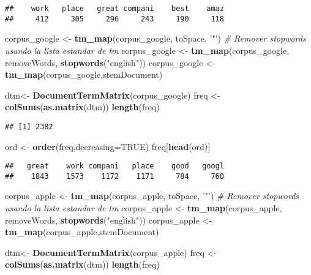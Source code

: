 \documentclass[]{article}
\newenvironment{Shaded}{\begin{snugshade}}{\end{snugshade}}
\newcommand{\KeywordTok}[1]{\textcolor[rgb]{0.13,0.29,0.53}{\textbf{#1}}}
\newcommand{\DataTypeTok}[1]{\textcolor[rgb]{0.13,0.29,0.53}{#1}}
\newcommand{\StringTok}[1]{\textcolor[rgb]{0.31,0.60,0.02}{#1}}
\newcommand{\CommentTok}[1]{\textcolor[rgb]{0.56,0.35,0.01}{\textit{#1}}}
\newcommand{\OtherTok}[1]{\textcolor[rgb]{0.56,0.35,0.01}{#1}}
\newcommand{\NormalTok}[1]{#1}
\begin{document}
\begin{verbatim}
##    work   place   great compani    best    amaz 
##     412     305     296     243     190     118
\end{verbatim}

\begin{Shaded}
\begin{Highlighting}[]
\NormalTok{corpus_google <-}\StringTok{ }\KeywordTok{tm_map}\NormalTok{(corpus_google, toSpace, }\StringTok{'"'}\NormalTok{)}
\CommentTok{# Remover stopwords usando la lista estandar de tm}
\NormalTok{corpus_google <-}\StringTok{ }\KeywordTok{tm_map}\NormalTok{(corpus_google, removeWords, }\KeywordTok{stopwords}\NormalTok{(}\StringTok{"english"}\NormalTok{))}
\NormalTok{corpus_google <-}\StringTok{ }\KeywordTok{tm_map}\NormalTok{(corpus_google,stemDocument)}

\NormalTok{dtm<-}\StringTok{ }\KeywordTok{DocumentTermMatrix}\NormalTok{(corpus_google)}
\NormalTok{freq <-}\StringTok{ }\KeywordTok{colSums}\NormalTok{(}\KeywordTok{as.matrix}\NormalTok{(dtm))}
\KeywordTok{length}\NormalTok{(freq)}
\end{Highlighting}
\end{Shaded}

\begin{verbatim}
## [1] 2382
\end{verbatim}

\begin{Shaded}
\begin{Highlighting}[]
\NormalTok{ord <-}\StringTok{ }\KeywordTok{order}\NormalTok{(freq,}\DataTypeTok{decreasing=}\OtherTok{TRUE}\NormalTok{)}
\NormalTok{freq[}\KeywordTok{head}\NormalTok{(ord)]}
\end{Highlighting}
\end{Shaded}

\begin{verbatim}
##   great    work compani   place    good   googl 
##    1843    1573    1172    1171     784     760
\end{verbatim}

\begin{Shaded}
\begin{Highlighting}[]
\NormalTok{corpus_apple <-}\StringTok{ }\KeywordTok{tm_map}\NormalTok{(corpus_apple, toSpace, }\StringTok{'"'}\NormalTok{)}
\CommentTok{# Remover stopwords usando la lista estandar de tm}
\NormalTok{corpus_apple <-}\StringTok{ }\KeywordTok{tm_map}\NormalTok{(corpus_apple, removeWords, }\KeywordTok{stopwords}\NormalTok{(}\StringTok{"english"}\NormalTok{))}
\NormalTok{corpus_apple <-}\StringTok{ }\KeywordTok{tm_map}\NormalTok{(corpus_apple,stemDocument)}

\NormalTok{dtm<-}\StringTok{ }\KeywordTok{DocumentTermMatrix}\NormalTok{(corpus_apple)}
\NormalTok{freq <-}\StringTok{ }\KeywordTok{colSums}\NormalTok{(}\KeywordTok{as.matrix}\NormalTok{(dtm))}
\KeywordTok{length}\NormalTok{(freq)}
\end{Highlighting}
\end{Shaded}
\end{document}
